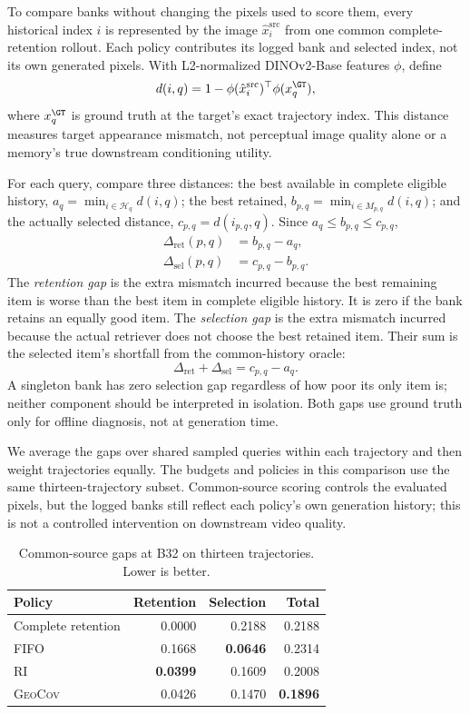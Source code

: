 \documentclass[10pt,twocolumn]{article}
\newcommand{\Geo}{\textsc{GeoCov}\xspace}
\newcommand{\RI}{\textsc{RI}\xspace}
\begin{document}
To compare banks without changing the pixels used to score them, every
historical index $i$ is represented by the image $\hat{x}^{\mathrm{src}}_i$
from one common complete-retention rollout. Each policy contributes its
logged bank and selected index, not its own generated pixels. With
L2-normalized DINOv2-Base features $\phi$, define
\begin{equation}
 d(i,q)=1-\phi(\hat{x}^{\mathrm{src}}_i)^\top\phi(x_q^{\GT}),
\end{equation}
where $x_q^{\GT}$ is ground truth at the target's exact trajectory index.
This distance measures target appearance mismatch, not perceptual image
quality alone or a memory's true downstream conditioning utility.

For each query, compare three distances: the best available in complete
eligible history, $a_q=\min_{i\in\mathcal{H}_q}d(i,q)$; the best retained,
$b_{p,q}=\min_{i\in M_{p,q}}d(i,q)$; and the actually selected distance,
$c_{p,q}=d(i_{p,q},q)$. Since $a_q\leq b_{p,q}\leq c_{p,q}$,
\begin{align}
 \Delta_{\mathrm{ret}}(p,q) &= b_{p,q}-a_q, \\
 \Delta_{\mathrm{sel}}(p,q) &= c_{p,q}-b_{p,q}.
 \label{eq:gaps}
\end{align}
The \emph{retention gap} is the extra mismatch incurred because the best
remaining item is worse than the best item in complete eligible history.
It is zero if the bank retains an equally good item. The \emph{selection
gap} is the extra mismatch incurred because the actual retriever does not
choose the best retained item. Their sum is the selected item's shortfall
from the common-history oracle:
\begin{equation}
 \Delta_{\mathrm{ret}}+\Delta_{\mathrm{sel}}=c_{p,q}-a_q.
\end{equation}
A singleton bank has zero selection gap regardless of how poor its only
item is; neither component should be interpreted in isolation. Both gaps
use ground truth only for offline diagnosis, not at generation time.

We average the gaps over shared sampled queries within each trajectory and
then weight trajectories equally. The budgets and policies in this comparison
use the same thirteen-trajectory subset. Common-source scoring controls the
evaluated pixels, but the logged banks still reflect each policy's own
generation history; this is not a controlled intervention on downstream
video quality.

\begin{table}[!htbp]
\centering
\caption{Common-source gaps at B32 on thirteen trajectories. Lower is better.}
\label{tab:gaps}
\small
\begin{tabular}{lrrr}
\toprule
Policy & Retention & Selection & Total \\
\midrule
Complete retention & 0.0000 & 0.2188 & 0.2188 \\
FIFO & 0.1668 & \textbf{0.0646} & 0.2314 \\
\RI & \textbf{0.0399} & 0.1609 & 0.2008 \\
\Geo & 0.0426 & 0.1470 & \textbf{0.1896} \\
\bottomrule
\end{tabular}
\end{table}
\end{document}
